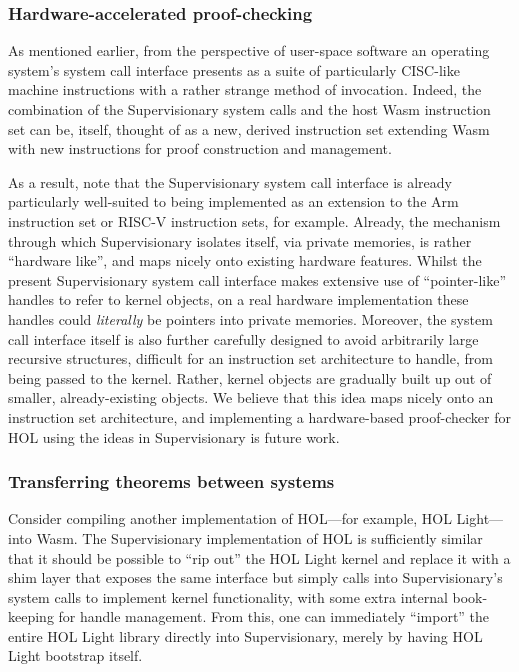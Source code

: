 \documentclass[a4paper, UKenglish, cleveref, autoref, thm-restate]{lipics-v2021}
\begin{document}
\subsubsection*{Hardware-accelerated proof-checking}

As mentioned earlier, from the perspective of user-space software an operating system's system call interface presents as a suite of particularly CISC-like machine instructions with a rather strange method of invocation.
Indeed, the combination of the Supervisionary system calls and the host Wasm instruction set can be, itself, thought of as a new, derived instruction set extending Wasm with new instructions for proof construction and management.

As a result, note that the Supervisionary system call interface is already particularly well-suited to being implemented as an extension to the Arm instruction set or RISC-V instruction sets, for example.
Already, the mechanism through which Supervisionary isolates itself, via private memories, is rather ``hardware like'', and maps nicely onto existing hardware features.
Whilst the present Supervisionary system call interface makes extensive use of ``pointer-like'' handles to refer to kernel objects, on a real hardware implementation these handles could \emph{literally} be pointers into private memories.
Moreover, the system call interface itself is also further carefully designed to avoid arbitrarily large recursive structures, difficult for an instruction set architecture to handle, from being passed to the kernel.
Rather, kernel objects are gradually built up out of smaller, already-existing objects.
We believe that this idea maps nicely onto an instruction set architecture, and implementing a hardware-based proof-checker for HOL using the ideas in Supervisionary is future work.

\subsubsection*{Transferring theorems between systems}

Consider compiling another implementation of HOL---for example, HOL Light---into Wasm.
The Supervisionary implementation of HOL is sufficiently similar that it should be possible to ``rip out'' the HOL Light kernel and replace it with a shim layer that exposes the same interface but simply calls into Supervisionary's system calls to implement kernel functionality, with some extra internal book-keeping for handle management.
From this, one can immediately ``import'' the entire HOL Light library directly into Supervisionary, merely by having HOL Light bootstrap itself.
\end{document}
